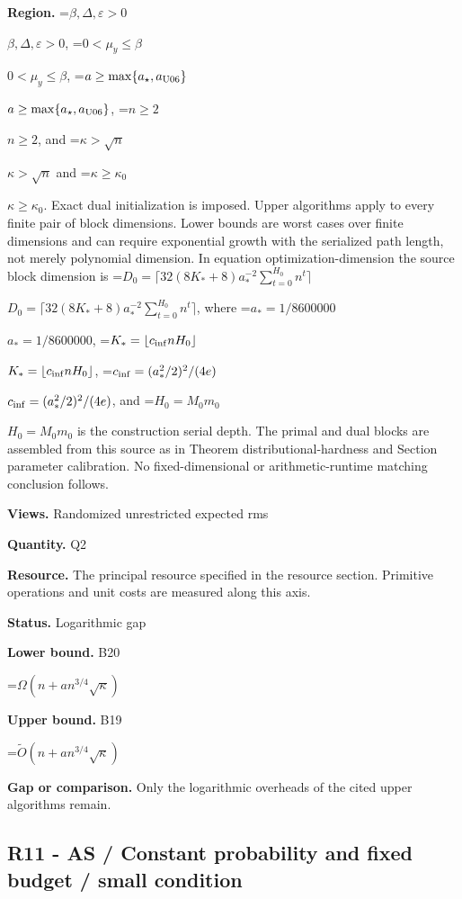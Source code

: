 \documentclass[10pt,a4paper]{article}
\newcommand{\AtlasMath}[1]{\par\begingroup\centering\setbox0=\hbox{$\displaystyle #1$}\ifdim\wd0>1.4\linewidth\typeout{ATLAS WIDE FORMULA: \the\wd0}\fi\ifdim\wd0>\linewidth\resizebox{\linewidth}{!}{\box0}\else\box0\fi\par\endgroup}
\newcommand{\AtlasInlineMath}[1]{\begingroup\setbox0=\hbox{$#1$}\ifdim\wd0>.4\linewidth\endgroup\AtlasMath{#1}\else\endgroup$#1$\fi}
\begin{document}
\textbf{Region.} \AtlasInlineMath{\beta,\Delta,\varepsilon>0}, \AtlasInlineMath{0<\mu_y\le\beta}, \AtlasInlineMath{a\ge\max\{a_\star,a_{\rm U06}\}}, \AtlasInlineMath{n\ge2}, and \AtlasInlineMath{\kappa>\sqrt n} and \AtlasInlineMath{\kappa\ge\kappa_0}. Exact dual initialization is imposed. Upper algorithms apply to every finite pair of block dimensions. Lower bounds are worst cases over finite dimensions and can require exponential growth with the serialized path length, not merely polynomial dimension. In equation optimization-dimension the source block dimension is \AtlasInlineMath{D_0=\lceil32(8K_*+8)a_*^{-2}\sum_{t=0}^{H_0}n^t\rceil}, where \AtlasInlineMath{a_*=1/8600000}, \AtlasInlineMath{K_*=\lfloor c_{\rm inf}nH_0\rfloor}, \AtlasInlineMath{c_{\rm inf}=(a_*^2/2)^2/(4e)}, and \AtlasInlineMath{H_0=M_0m_0} is the construction serial depth. The primal and dual blocks are assembled from this source as in Theorem distributional-hardness and Section parameter calibration. No fixed-dimensional or arithmetic-runtime matching conclusion follows.



\textbf{Views.} Randomized unrestricted expected rms



\textbf{Quantity.} Q2



\textbf{Resource.} The principal resource specified in the resource section. Primitive operations and unit costs are measured along this axis.



\textbf{Status.} Logarithmic gap



\textbf{Lower bound.} B20



\AtlasMath{\Omega(n+a n^{3/4}\sqrt\kappa)}


\textbf{Upper bound.} B19



\AtlasMath{\widetilde O(n+a n^{3/4}\sqrt\kappa)}


\textbf{Gap or comparison.} Only the logarithmic overheads of the cited upper algorithms remain.



\subsection{R11 - AS / Constant probability and fixed budget / small condition}
\end{document}
